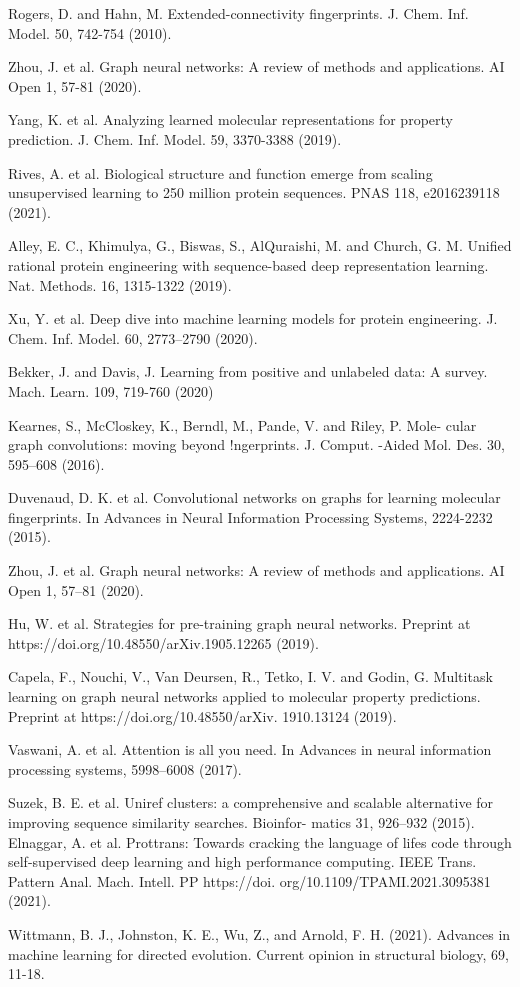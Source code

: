 \documentclass[12pt]{article}
\begin{document}
\begin{thebibliography}{99}
 Rogers, D. and Hahn, M. Extended-connectivity fingerprints. J. Chem. Inf. Model. 50, 742-754 (2010).

 Zhou, J. et al. Graph neural networks: A review of methods and applications. AI Open 1, 57-81 (2020).

 Yang, K. et al. Analyzing learned molecular representations for property prediction. J. Chem. Inf. Model. 59, 3370-3388 (2019).


 Rives, A. et al. Biological structure and function emerge from scaling unsupervised learning to 250 million protein sequences. PNAS 118, e2016239118 (2021).

 Alley, E. C., Khimulya, G., Biswas, S., AlQuraishi, M. and Church, G. M. Unified rational protein engineering with sequence-based deep representation learning. Nat. Methods. 16, 1315-1322 (2019).

 Xu, Y. et al. Deep dive into machine learning models for protein engineering. J. Chem. Inf. Model. 60, 2773–2790 (2020).

 Bekker, J. and Davis, J. Learning from positive and unlabeled data: A survey. Mach. Learn. 109, 719-760 (2020)


 Kearnes, S., McCloskey, K., Berndl, M., Pande, V. and  Riley, P. Mole- cular graph convolutions: moving beyond !ngerprints. J. Comput. -Aided Mol. Des. 30, 595–608 (2016).

 Duvenaud, D. K. et al. Convolutional networks on graphs for learning molecular fingerprints. In Advances in Neural Information Processing Systems, 2224-2232 (2015).

 Zhou, J. et al. Graph neural networks: A review of methods and applications. AI Open 1, 57–81 (2020).

 Hu, W. et al. Strategies for pre-training graph neural networks. Preprint at https://doi.org/10.48550/arXiv.1905.12265 (2019). 



 Capela, F., Nouchi, V., Van Deursen, R., Tetko, I. V. and  Godin, G. Multitask learning on graph neural networks applied to molecular property predictions. Preprint at https://doi.org/10.48550/arXiv. 1910.13124 (2019).

  Vaswani, A. et al. Attention is all you need. In Advances in neural information processing systems, 5998–6008 (2017).

 Suzek, B. E. et al. Uniref clusters: a comprehensive and scalable alternative for improving sequence similarity searches. Bioinfor- matics 31, 926–932 (2015).
 Elnaggar, A. et al. Prottrans: Towards cracking the language of lifes code through self-supervised deep learning and high performance computing. IEEE Trans. Pattern Anal. Mach. Intell. PP https://doi. org/10.1109/TPAMI.2021.3095381 (2021).


 Wittmann, B. J., Johnston, K. E., Wu, Z., and  Arnold, F. H. (2021). Advances in machine learning for directed evolution. Current opinion in structural biology, 69, 11-18.

\end{thebibliography}
\end{document}
